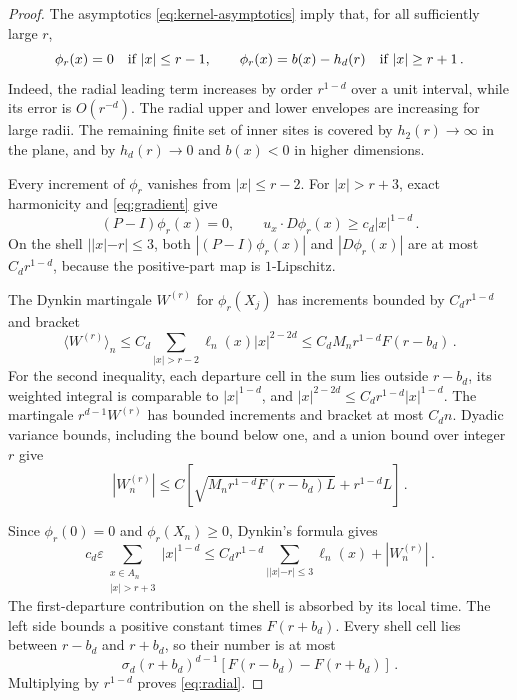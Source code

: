 \documentclass[11pt]{amsart}
\theoremstyle{plain}
\theoremstyle{definition}
\newcommand{\eps}{\varepsilon}
\begin{document}
\begin{proof}
The asymptotics \eqref{eq:kernel-asymptotics} imply that, for all
sufficiently large $r$,
\begin{equation}\label{eq:levelsets}
\phi_r(x)=0\quad\hbox{if }|x|\leq r-1 ,\qquad
\phi_r(x)=b(x)-h_d(r)\quad\hbox{if }|x|\geq r+1\, .
\end{equation}
Indeed, the radial leading term increases by order $r^{1-d}$
over a unit interval, while its error is $O(r^{-d})$.
The radial upper and lower envelopes are increasing for large radii.
The remaining finite set of inner sites is covered by $h_2(r)\to\infty$
in the plane, and by $h_d(r)\to0$ and $b(x)<0$ in higher dimensions.

Every increment of $\phi_r$ vanishes from $|x|\leq r-2$.
For $|x|>r+3$, exact harmonicity and \eqref{eq:gradient} give
\begin{equation}\label{eq:radial-drift}
(P-I)\phi_r(x)=0 ,\qquad
u_x\cdot D\phi_r(x)\geq c_d|x|^{1-d}\, .
\end{equation}
On the shell $||x|-r|\leq3$, both $|(P-I)\phi_r(x)|$ and
$|D\phi_r(x)|$ are at most $C_dr^{1-d}$, because the positive-part
map is $1$-Lipschitz.

The Dynkin martingale $W^{(r)}$ for $\phi_r(X_j)$ has increments
bounded by $C_dr^{1-d}$ and bracket
\begin{equation}\label{eq:radialbracket}
\langle W^{(r)}\rangle_n
\leq C_d\sum_{|x|>r-2}\ell_n(x)|x|^{2-2d}
\leq C_dM_nr^{1-d}F(r-b_d)\, .
\end{equation}
For the second inequality, each departure cell in the sum lies outside
$r-b_d$, its weighted integral is comparable to $|x|^{1-d}$, and
$|x|^{2-2d}\leq C_dr^{1-d}|x|^{1-d}$.
The martingale $r^{d-1}W^{(r)}$ has bounded increments and bracket
at most $C_dn$. Dyadic variance bounds, including the bound below one,
and a union bound over integer $r$ give
\begin{equation}\label{eq:radialmart}
|W_n^{(r)}|\leq C\left[
\sqrt{M_nr^{1-d}F(r-b_d)L}+r^{1-d}L\right]\, .
\end{equation}

Since $\phi_r(0)=0$ and $\phi_r(X_n)\geq0$, Dynkin's formula gives
\begin{equation}\label{eq:radial-source}
c_d\eps\sum_{\substack{x\in A_n\\|x|>r+3}}|x|^{1-d}
\leq C_dr^{1-d}\sum_{||x|-r|\leq3}\ell_n(x)+|W_n^{(r)}|\, .
\end{equation}
The first-departure contribution on the shell is absorbed by its local
time. The left side bounds a positive constant times $F(r+b_d)$.
Every shell cell lies between $r-b_d$ and $r+b_d$, so their number
is at most
\begin{equation}\label{eq:shell-count}
\sigma_d(r+b_d)^{d-1}[F(r-b_d)-F(r+b_d)]\, .
\end{equation}
Multiplying by $r^{1-d}$ proves \eqref{eq:radial}.
\end{proof}
\end{document}
